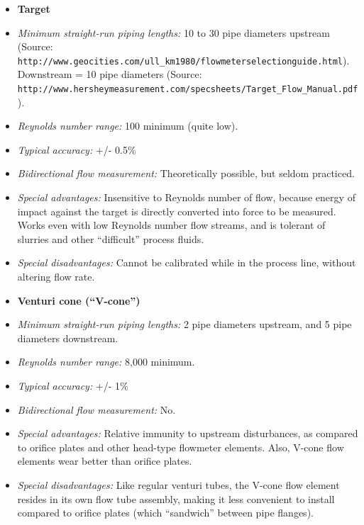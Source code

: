 \vskip 10pt


\begin{itemize}
\goodbreak
\item{} {\bf Target}
\item{} {\it Minimum straight-run piping lengths:} 10 to 30 pipe diameters upstream (Source: {\tt http://www.geocities.com/ull\_km1980/flowmeterselectionguide.html}).  Downstream = 10 pipe diameters (Source: {\tt http://www.hersheymeasurement.com/specsheets/Target\_Flow\_Manual.pdf}).
\item{} {\it Reynolds number range:} 100 minimum (quite low).
\item{} {\it Typical accuracy:} +/- 0.5\% 
\item{} {\it Bidirectional flow measurement:} Theoretically possible, but seldom practiced.
\item{} {\it Special advantages:} Insensitive to Reynolds number of flow, because energy of impact against the target is directly converted into force to be measured.  Works even with low Reynolds number flow streams, and is tolerant of slurries and other ``difficult'' process fluids.
\item{} {\it Special disadvantages:} Cannot be calibrated while in the process line, without altering flow rate.
\end{itemize}


\vskip 10pt


\begin{itemize}
\item{} {\bf Venturi cone (``V-cone'')}
\item{} {\it Minimum straight-run piping lengths:} 2 pipe diameters upstream, and 5 pipe diameters downstream.
\item{} {\it Reynolds number range:} 8,000 minimum.
\item{} {\it Typical accuracy:} +/- 1\%
\item{} {\it Bidirectional flow measurement:} No.
\item{} {\it Special advantages:} Relative immunity to upstream disturbances, as compared to orifice plates and other head-type flowmeter elements.  Also, V-cone flow elements wear better than orifice plates.
\item{} {\it Special disadvantages:} Like regular venturi tubes, the V-cone flow element resides in its own flow tube assembly, making it less convenient to install compared to orifice plates (which ``sandwich'' between pipe flanges).
\end{itemize}


